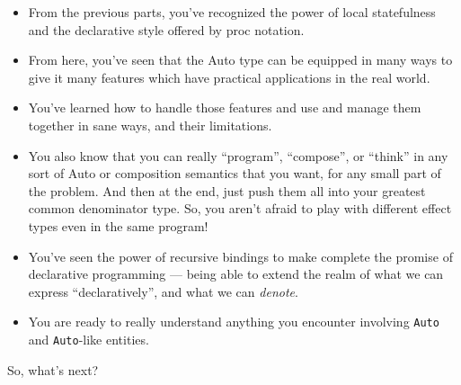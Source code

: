 \documentclass[]{article}
\begin{document}
\begin{itemize}
\item
  From the previous parts, you've recognized the power of local statefulness and
  the declarative style offered by proc notation.
\item
  From here, you've seen that the Auto type can be equipped in many ways to give
  it many features which have practical applications in the real world.
\item
  You've learned how to handle those features and use and manage them together
  in sane ways, and their limitations.
\item
  You also know that you can really ``program'', ``compose'', or ``think'' in
  any sort of Auto or composition semantics that you want, for any small part of
  the problem. And then at the end, just push them all into your greatest common
  denominator type. So, you aren't afraid to play with different effect types
  even in the same program!
\item
  You've seen the power of recursive bindings to make complete the promise of
  declarative programming --- being able to extend the realm of what we can
  express ``declaratively'', and what we can \emph{denote}.
\item
  You are ready to really understand anything you encounter involving
  \texttt{Auto} and \texttt{Auto}-like entities.
\end{itemize}

So, what's next?
\end{document}
